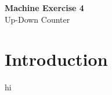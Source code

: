 \clearpage
\setcounter{page}{1}

\begin{center}
    \vspace*{3em}
    {\LARGE \textbf{Machine Exercise 4}}\\
    {\vspace{1.5em}}
    {\large Up-Down Counter}\\
\end{center}

\section{Introduction}
    hi